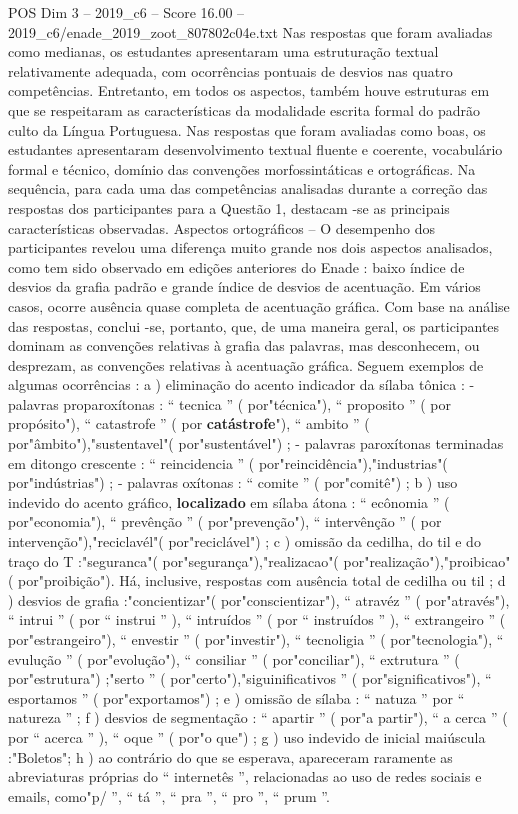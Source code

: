 \begin{textsample}{POS Dim 3 – 2019\_c6 – Score 16.00 – 2019\_c6/enade\_2019\_zoot\_807802c04e.txt}
Nas respostas que foram avaliadas como medianas, os estudantes apresentaram uma estruturação textual relativamente adequada, com ocorrências pontuais de desvios nas quatro competências.
Entretanto, em todos os aspectos, também houve estruturas em que se respeitaram as características da modalidade escrita formal do padrão culto da Língua Portuguesa.
Nas respostas que foram avaliadas como boas, os estudantes apresentaram desenvolvimento textual fluente e coerente, vocabulário formal e técnico, domínio das convenções morfossintáticas e ortográficas.
Na sequência, para cada uma das competências analisadas durante a correção das respostas dos participantes para a Questão 1, destacam -se as principais características observadas.
Aspectos ortográficos – O desempenho dos participantes revelou uma diferença muito grande nos dois aspectos analisados, como tem sido observado em edições anteriores do Enade : baixo índice de desvios da grafia padrão e grande índice de desvios de acentuação.
Em vários casos, ocorre ausência quase completa de acentuação gráfica.
Com base na análise das respostas, conclui -se, portanto, que, de uma maneira geral, os participantes dominam as convenções relativas à grafia das palavras, mas desconhecem, ou desprezam, as convenções relativas à acentuação gráfica.
Seguem exemplos de algumas ocorrências : a ) eliminação do acento indicador da sílaba tônica : - palavras proparoxítonas : “ tecnica ” ( por"técnica"), “ proposito ” ( por propósito"), “ catastrofe ” ( por \textbf{catástrofe}"), “ ambito ” ( por"âmbito"),"sustentavel"( por"sustentável") ; - palavras paroxítonas terminadas em ditongo crescente : “ reincidencia ” ( por"reincidência"),"industrias"( por"indústrias") ; - palavras oxítonas : “ comite ” ( por"comitê") ; b ) uso indevido do acento gráfico, \textbf{localizado} em sílaba átona : “ ecônomia ” ( por"economia"), “ prevênção ” ( por"prevenção"), “ intervênção ” ( por intervenção"),"reciclavél"( por"reciclável") ; c ) omissão da cedilha, do til e do traço do T :"seguranca"( por"segurança"),"realizacao"( por"realização"),"proibicao"( por"proibição").
Há, inclusive, respostas com ausência total de cedilha ou til ; d ) desvios de grafia :"concientizar"( por"conscientizar"), “ atravéz ” ( por"através"), “ intrui ” ( por “ instrui ” ), “ intruídos ” ( por “ instruídos ” ), “ extrangeiro ” ( por"estrangeiro"), “ envestir ” ( por"investir"), “ tecnoligia ” ( por"tecnologia"), “ evulução ” ( por"evolução"), “ consiliar ” ( por"conciliar"), “ extrutura ” ( por"estrutura") ;"serto ” ( por"certo"),"siguinificativos ” ( por"significativos"), “ esportamos ” ( por"exportamos") ; e ) omissão de sílaba : “ natuza ” por “ natureza ” ; f ) desvios de segmentação : “ apartir ” ( por"a partir"), “ a cerca ” ( por “ acerca ” ), “ oque ” ( por"o que") ; g ) uso indevido de inicial maiúscula :"Boletos"; h ) ao contrário do que se esperava, apareceram raramente as abreviaturas próprias do “ internetês ”, relacionadas ao uso de redes sociais e emails, como"p/ ”, “ tá ”, “ pra ”, “ pro ”, “ prum ”.

\end{textsample}
